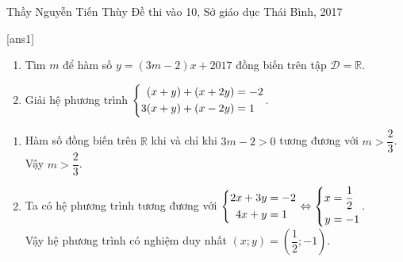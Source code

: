 \begin{name}
{Thầy  Nguyễn Tiến Thùy}
{Đề thi vào 10, Sở giáo dục Thái Bình, 2017}
\end{name}
\setcounter{ex}{0}
[ans1]
\begin{ex}%
    \hfill
    \begin{enumerate}
        \item Tìm $m$ để hàm số $y=(3m-2)x+2017$ đồng biến trên tập $\mathscr{D}=\mathbb{R}$.
        \item Giải hệ phương trình $\left\{\begin{aligned}(x+y)+(x+2y)&=-2\\ 3(x+y)+(x-2y)&=1\end{aligned}\right.$.
    \end{enumerate}
\loigiai
    {
    \begin{enumerate}
        \item Hàm số đồng biến trên $\mathbb{R}$ khi và chỉ khi $3m-2>0$ tương đương với $m>\dfrac{2}{3}$.\\
        Vậy $m>\dfrac{2}{3}$.
        \item Ta có hệ phương trình tương đương với $\left\{\begin{aligned}2x+3y&=-2\\ 4x+y&=1\end{aligned}\right.\Leftrightarrow \left\{\begin{aligned}x&=\dfrac{1}{2}\\ y&=-1\end{aligned}\right.$.\\
        Vậy hệ phương trình có nghiệm duy nhất $(x; y)=\left(\dfrac{1}{2}; -1\right)$.
    \end{enumerate}
    }
\end{ex}

